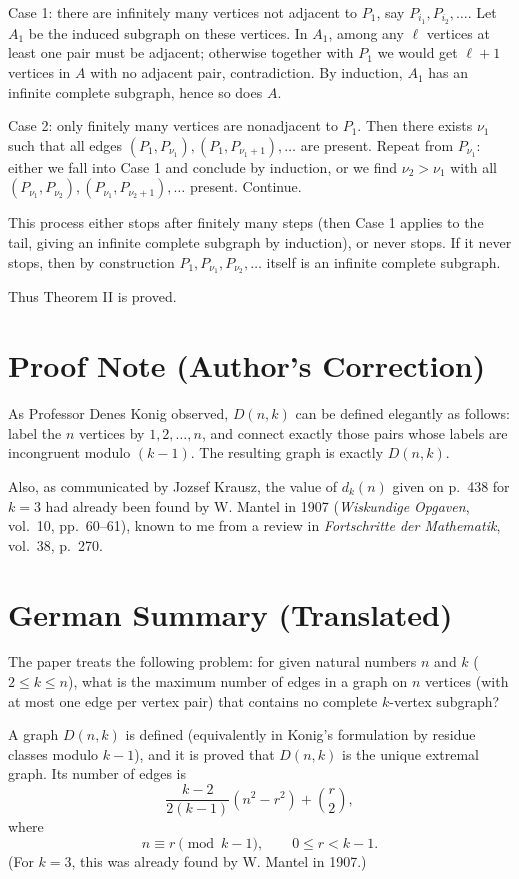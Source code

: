 \documentclass[11pt]{article}
\begin{document}
Case 1: there are infinitely many vertices not adjacent to $P_1$, say $P_{i_1},P_{i_2},\dots$. Let $A_1$ be the induced subgraph on these vertices. In $A_1$, among any $\ell$ vertices at least one pair must be adjacent; otherwise together with $P_1$ we would get $\ell+1$ vertices in $A$ with no adjacent pair, contradiction. By induction, $A_1$ has an infinite complete subgraph, hence so does $A$.

Case 2: only finitely many vertices are nonadjacent to $P_1$. Then there exists $\nu_1$ such that all edges $(P_1,P_{\nu_1}),(P_1,P_{\nu_1+1}),\dots$ are present. Repeat from $P_{\nu_1}$: either we fall into Case 1 and conclude by induction, or we find $\nu_2>\nu_1$ with all $(P_{\nu_1},P_{\nu_2}),(P_{\nu_1},P_{\nu_2+1}),\dots$ present. Continue.

This process either stops after finitely many steps (then Case 1 applies to the tail, giving an infinite complete subgraph by induction), or never stops. If it never stops, then by construction $P_1,P_{\nu_1},P_{\nu_2},\dots$ itself is an infinite complete subgraph.

Thus Theorem II is proved.

\section*{Proof Note (Author's Correction)}
As Professor Denes Konig observed, $D(n,k)$ can be defined elegantly as follows: label the $n$ vertices by $1,2,\dots,n$, and connect exactly those pairs whose labels are incongruent modulo $(k-1)$. The resulting graph is exactly $D(n,k)$.

Also, as communicated by Jozsef Krausz, the value of $d_k(n)$ given on p.~438 for $k=3$ had already been found by W. Mantel in 1907 (\emph{Wiskundige Opgaven}, vol.~10, pp.~60--61), known to me from a review in \emph{Fortschritte der Mathematik}, vol.~38, p.~270.

\section*{German Summary (Translated)}
The paper treats the following problem: for given natural numbers $n$ and $k$ ($2\le k\le n$), what is the maximum number of edges in a graph on $n$ vertices (with at most one edge per vertex pair) that contains no complete $k$-vertex subgraph?

A graph $D(n,k)$ is defined (equivalently in Konig's formulation by residue classes modulo $k-1$), and it is proved that $D(n,k)$ is the unique extremal graph. Its number of edges is
\[
\frac{k-2}{2(k-1)}(n^2-r^2)+\binom{r}{2},
\]
where
\[
n\equiv r\pmod{k-1},\qquad 0\le r<k-1.
\]
(For $k=3$, this was already found by W. Mantel in 1907.)
\end{document}
